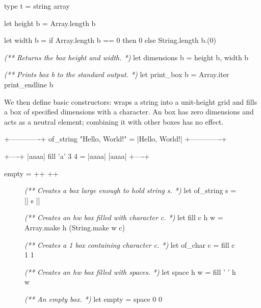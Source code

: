 \documentclass{article}
\begin{document}
\begin{code}[ocaml]
type t = string array

let height b = Array.length b\label{ref-height}

let width b = if Array.length b == 0 then 0 else String.length b.(0)\label{ref-width}

\emph{(** Returns the box height and width. *)}
let dimensions b = height b, width b

\emph{(** Prints box b to the standard output. *)}
let print_box b = Array.iter print_endline b
\end{code}

We then define basic constructors:
\href{#ref-of-string}{} wraps a string into a unit-height grid and \href{#ref-fill}{} fills a box of specified dimensions with a character.
An \href{#ref-empty}{} box has zero dimensions and acts as a neutral element; combining it with other boxes has no effect.

\begin{code}
                            +-------------+
of_string "Hello, World!" = |Hello, World!|
                            +-------------+

               +----+
               |aaaa|
fill 'a' 3 4 = |aaaa|
               |aaaa|
               +----+

empty = ++
        ++
\end{code}

\begin{figure}
\begin{code}[ocaml]
\emph{(** Creates a box large enough to hold string s. *)}
let of_string s = [| s |]\label{ref-of-string}

\emph{(** Creates an h\times w box filled with character c. *)}
let fill c h w = Array.make h (String.make w c)\label{ref-fill}

\emph{(** Creates a 1 box containing character c. *)}
let of_char c = fill c 1 1

\emph{(** Creates an h\times w box filled with spaces. *)}
let space h w = fill ' ' h w

\emph{(** An empty box. *)}
let empty = space 0 0\label{ref-empty}
\end{code}
\end{figure}
\end{document}
